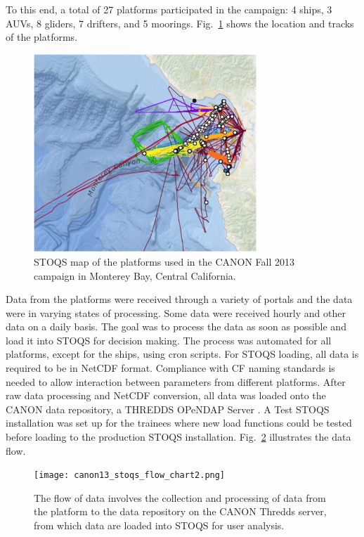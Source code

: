 \documentclass[conference]{IEEEtran}
\begin{document}
To this end, a total of 27 platforms participated in the campaign: 4 ships, 3 AUVs, 8 gliders, 7 drifters, and 5 moorings.  Fig.~\ref{fig:ReikoFigure1} shows the location and tracks of the platforms.

\begin{figure}[htbp]
\centering
\includegraphics[width=3.3in]{ReikoFigure1.png}
\caption{STOQS map of the platforms used in the CANON Fall 2013 campaign in Monterey Bay, Central California.}
\label{fig:ReikoFigure1}
\end{figure}

Data from the platforms were received through a variety of portals and the data were in varying states of processing.  Some data were received hourly and other data on a daily basis.  The goal was to process the data as soon as possible and load it into STOQS for decision making.  The process was automated for all platforms, except for the ships, using cron scripts.  For STOQS loading, all data is required to be in NetCDF format.  Compliance with CF naming standards is needed to allow interaction between parameters from different platforms.  After raw data processing and NetCDF conversion, all data was loaded onto the CANON data repository, a THREDDS OPeNDAP Server \cite{TDS}.  A Test STOQS installation was set up for the trainees where new load functions could be tested before loading to the production STOQS installation.   Fig.~\ref{fig:ReikoFigure2} illustrates the data flow.

\begin{figure}[htbp]
\centering
\texttt{[image: canon13\_stoqs\_flow\_chart2.png]}
\caption{The flow of data involves the collection and processing of data from the platform to the data repository on the CANON Thredds server, from which data are loaded into STOQS for user analysis.}
\label{fig:ReikoFigure2}
\end{figure}
\end{document}
